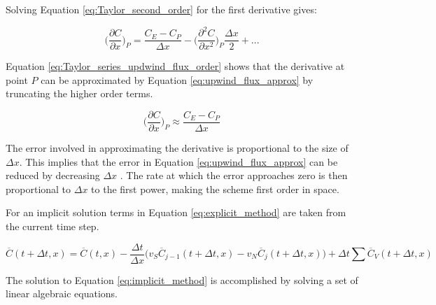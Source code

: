 Solving Equation \ref{eq:Taylor_second_order} for the first derivative gives:

\begin{equation}
    \bigg(\frac{\partial C}{\partial x}\bigg)_{P} = \frac{C_{E} - C_{P}}{\Delta x} - \bigg(\frac{\partial^{2} C}{\partial x^{2}}\bigg)_{P}\frac{\Delta x}{2} + ...
    \label{eq:Taylor_series_updwind_flux_order}
\end{equation}

Equation \ref{eq:Taylor_series_updwind_flux_order} shows that the derivative at point $P$ can be approximated by Equation \ref{eq:upwind_flux_approx} by truncating the higher order terms. 

\begin{equation}
    \bigg(\frac{\partial C}{\partial x}\bigg)_{P} \approx \frac{C_{E} - C_{P}}{\Delta x}
    \label{eq:upwind_flux_approx}
\end{equation}

The error involved in approximating the derivative is proportional to the size of $\Delta x$. This implies that the error in Equation \ref{eq:upwind_flux_approx} can be reduced by decreasing $\Delta x$ \cite{versteeg2007}. The rate at which the error approaches zero is then proportional to $\Delta x$ to the first power, making the scheme first order in space. 

For an implicit solution terms in Equation \ref{eq:explicit_method} are taken from the current time step.

\begin{equation}
    \overline{C}(t+\Delta t, x) = \overline{C}(t,x) - \frac{\Delta t}{\Delta x} \big(v_{S} \overline{C}_{j-1}(t+\Delta t,x) - v_{N}\overline{C}_{j}(t+\Delta t,x)\big)  + \Delta t\sum \overline{C}_{V}(t+\Delta t,x)
    \label{eq:implicit_method}
\end{equation}

The solution to Equation \ref{eq:implicit_method} is accomplished by solving a set of linear algebraic equations. 

